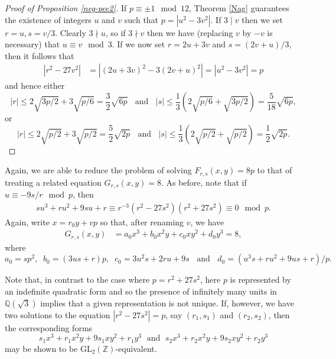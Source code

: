 \begin{proof}[Proof of Proposition \ref{neg-pee2}]
If $p \equiv \pm 1 \mod{12}$, Theorem  \ref{Nag} guarantees the existence of integers $u$ and $v$ such that $p = |u^2-3v^2|$.
If $3\mid v$ then we set $r=u, s=v/3$. 
Clearly $3\nmid u$, so if $3 \nmid v$ then we have (replacing $v$ by $-v$ is necessary) that $u \equiv v \mod{3}$. If we now 
set $r=2u+3v$ and $s=(2v+u)/3$, then it follows that
\begin{align*}
|r^2 - 27 v^2| &= |(2u+3v)^2 - 3 (2v+u)^2| = |u^2 - 3 v^2|  = p
\end{align*}
and hence either 
$$
|r| \leq 2 \sqrt{3p/2} + 3 \sqrt{p/6} = \frac{3}{2} \sqrt{6 p}  \; \; \mbox{ and } \; \; 
|s| \leq \frac{1}{3} (2 \sqrt{p/6}  + \sqrt{3p/2} ) = \frac{5}{18} \sqrt{6p},
$$
or
$$
|r| \leq 2 \sqrt{p/2} + 3 \sqrt{p/2} = \frac{5}{2} \sqrt{2 p} \; \; \mbox{ and } \; \; 
|s| \leq \frac{1}{3} (2 \sqrt{p/2}  + \sqrt{p/2} ) = \frac{1}{2} \sqrt{2 p}.
$$
\end{proof}

Again, we are able to reduce the problem of solving $F_{r,s}(x,y)=8p$ to that of treating a related 
equation $G_{r,s}(x,y)=8$. As before, note that if $u \equiv -9s/r 
\mod{p}$, then
\begin{align*}
s u^3 + r u^2 + 9 s u + r  \equiv r^{-3} (r^2-27 s^2) (r^2+27s^2) \equiv 0 \mod{p}.
\end{align*}
Again, write $x=r_0y+vp$ so that, after renaming $v$, we have
\begin{align*}
G_{r,s}(x,y) &= a_0 x^3 + b_0 x^2 y + c_0 x y^2 + d_0 y^3 =8,
\end{align*}
where
$$
a_0 = s p^2, \; \; 
b_0 = (3 u s+r) p, \; \;
c_0 = 3 u^2 s+2 r u + 9s \; \; \mbox{ and } \; \; 
d_0 = (u^3 s+r u^2 + 9 u s + r)/p.
$$

Note that, in contrast to the case where $p =r^2 + 27s^2$, here $p$ is represented by an indefinite quadratic form and so the presence of infinitely many units in $\mathbb{Q}(\sqrt{3})$ implies that a given representation is not unique. 
If, however, we have two solutions to the equation $|r^2-27s^2|=p$, say $(r_1,s_1)$ and $(r_2,s_2)$, then the corresponding forms
$$
s_1x^3+r_1 x^2y + 9s_1 x y^2 + r_1 y^3 \; \mbox{ and } \; s_2x^3+r_2 x^2y + 9s_2 x y^2 + r_2 y^3
$$
may be shown to be $\mbox{GL}_2 ( \mathbb{Z})$-equivalent.

% 

